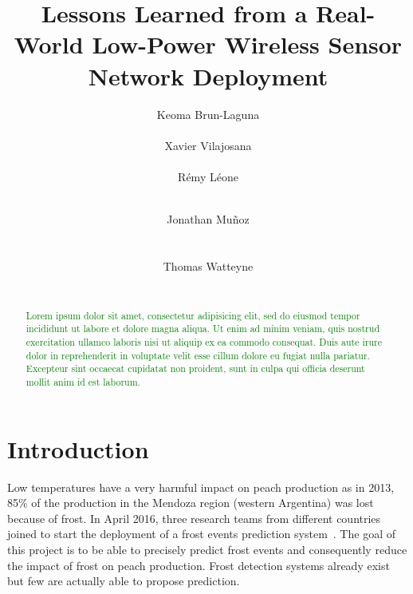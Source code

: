 \documentclass{sig-alternate}
\newcommand{\lorem}               {\textcolor{green}{Lorem ipsum dolor sit amet, consectetur adipisicing elit, sed do eiusmod tempor incididunt ut labore et dolore magna aliqua. Ut enim ad minim veniam, quis nostrud exercitation ullamco laboris nisi ut aliquip ex ea commodo consequat. Duis aute irure dolor in reprehenderit in voluptate velit esse cillum dolore eu fugiat nulla pariatur. Excepteur sint occaecat cupidatat non proident, sunt in culpa qui officia deserunt mollit anim id est laborum.}}
\begin{document}
\title{Lessons Learned from a Real-World Low-Power Wireless Sensor Network Deployment}

\author{
  \alignauthor Keoma Brun-Laguna\\
    \\
  \alignauthor Xavier Vilajosana\\
    \\
  \alignauthor Rémy Léone\\
    \\
  \and
  \alignauthor Jonathan Muñoz\\
    \\
    \\
  \alignauthor Thomas Watteyne\\
    \\
}

\maketitle

\begin{abstract}
\lorem
\end{abstract}

\section{Introduction}
\label{sec:intro}


Low temperatures have a very harmful impact on peach production as in 2013, 85\% of the production in the Mendoza region (western Argentina) was lost because of frost.
In April 2016, three research teams from different countries joined to start the deployment of a frost events prediction system~\cite{watteyne16peach}.
The goal of this project is to be able to precisely predict frost events and consequently reduce the impact of frost on peach production.
Frost detection systems already exist but few are actually able to propose prediction.
\end{document}
